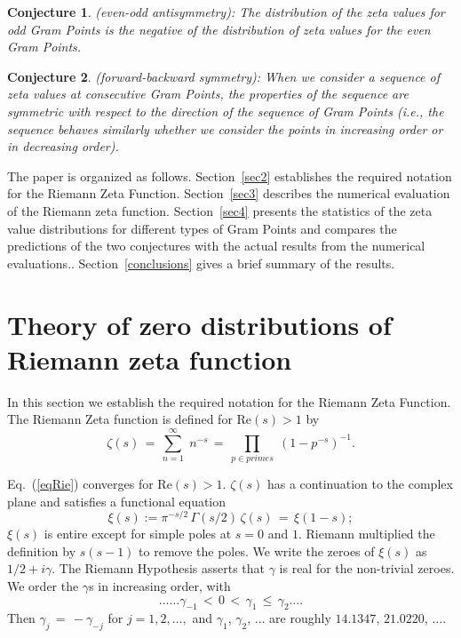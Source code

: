 \documentclass[twoside]{article}
\newtheorem{mydef}{Conjecture}
\begin{document}
\begin{mydef}\label{antisymmetry}
(even-odd antisymmetry): The distribution of the zeta values for odd Gram Points is the negative of the distribution of zeta values for the even Gram Points.
\end{mydef}
\begin{mydef}\label{symmetry}
(forward-backward symmetry): When we consider a sequence of zeta values at consecutive Gram Points, the properties of the sequence are symmetric with respect to the direction of the sequence of Gram Points (i.e., the sequence behaves similarly whether we consider the points in increasing order or in decreasing order).
\end{mydef}

The paper is organized as follows.
Section~\ref{sec2} establishes the required notation for the 
Riemann Zeta Function. 
Section~\ref{sec3} describes the numerical evaluation of the Riemann zeta function. 
Section~\ref{sec4} presents the statistics of the zeta value distributions for different types of Gram Points and compares the predictions of the two conjectures with the actual results from the numerical evaluations.. 
Section~\ref{conclusions}
gives a brief summary of the results. 


\section{\label{sec2}Theory of zero distributions of Riemann zeta function }

In this section we  establish the required notation for the 
Riemann Zeta Function. 
The Riemann Zeta function is defined for $\mathrm{Re} (s) > 1$ by
\begin{equation}
\zeta ( s ) \, = \, \sum^{\infty}_{n = 1} \; n^{-s} \, = \, \prod_{p \in primes} \;
\left( 1 - p^{-s} \right)^{-1}.
\label{eqRie}
\end{equation}

Eq.~(\ref{eqRie})  converges for $\mathrm{Re} (s) > 1$.  
 $\zeta ( s )$ has a  continuation
to the complex plane and satisfies a functional equation \cite{Riemann(1858),Riemann(1892),Titchmarsh(1986),Edwards(1974)}
\begin{equation}  
\xi(s):= \pi^{-s/2} \, \Gamma (s/2) \, \zeta ( s ) \, = \, \xi ( 1 - s );
\label{eq:func}
\end{equation}
$\xi(s)$ is entire except for simple poles at $s = 0$ and $1$. Riemann
multiplied the definition by $s(s-1)$ to remove the poles. We
write the zeroes of $\xi(s)$ as $1/2 + i \gamma$. The Riemann Hypothesis  
asserts that $\gamma$ is real for the non-trivial zeroes.
We order the $\gamma$s in increasing order, with 
\begin{equation}
\ldots \ldots \gamma_{-1} \, < \, 0 \, < \, 
\gamma_1 \, \leq \, \gamma_2 \ldots. 
\end{equation}
Then $\gamma_j \, = \, - \gamma_{-j}$ for $j = 1, 2, \ldots,$ 
and    $\gamma_1$, $\gamma_2$, $\ldots$  are roughly
$14.1347$, $21.0220$, $\ldots$.
\end{document}
